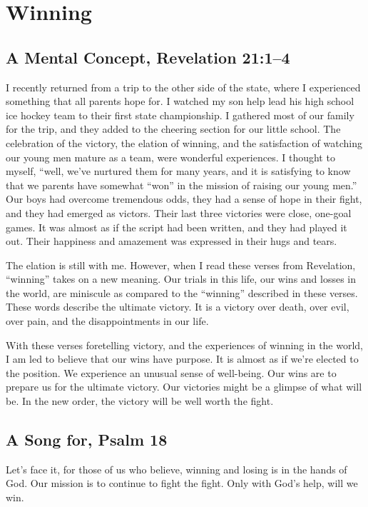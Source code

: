 \documentclass[12pt]{memoir}
\begin{document}
\section{Winning}

\subsection{A Mental Concept, Revelation 21:1--4}

I recently returned from a trip to the other side of the state, where
I experienced something that all parents hope for. I watched my son
help lead his high school ice hockey team to their first state championship.
I gathered most of our family for the trip, and they added to the
cheering section for our little school. The celebration of the victory,
the elation of winning, and the satisfaction of watching our young
men mature as a team, were wonderful experiences. I thought to myself,
``well, we've nurtured them for many years, and it is satisfying
to know that we parents have somewhat ``won'' in the mission of
raising our young men.'' Our boys had overcome tremendous odds, they
had a sense of hope in their fight, and they had emerged as victors.
Their last three victories were close, one-goal games. It was almost
as if the script had been written, and they had played it out. Their
happiness and amazement was expressed in their hugs and tears.

The elation is still with me. However, when I read these verses from
Revelation, ``winning'' takes on a new meaning. Our trials in this
life, our wins and losses in the world, are miniscule as compared
to the ``winning'' described in these verses. These words describe
the ultimate victory. It is a victory over death, over evil, over
pain, and the disappointments in our life.

With these verses foretelling victory, and the experiences of winning
in the world, I am led to believe that our wins have purpose. It is
almost as if we're elected to the position. We experience an unusual
sense of well-being. Our wins are to prepare us for the ultimate victory.
Our victories might be a glimpse of what will be. In the new order,
the victory will be well worth the fight. 

\subsection{A Song for, Psalm 18}

Let's face it, for those of us who believe, winning and losing is
in the hands of God. Our mission is to continue to fight the fight.
Only with God's help, will we win.
\end{document}
